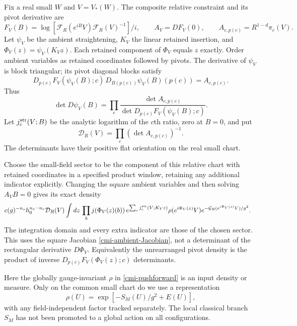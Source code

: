 Fix a real small $W$ and $V=V_*(W)$. The composite relative
constraint and its pivot derivative are
\begin{equation}\label{cmi-relative}
 F_V(B)=\log[\mathcal F_R(e^{iB}V)\mathcal F_R(V)^{-1}]/i,
 \qquad A_V=D F_V(0),\qquad
 A_{c,p(c)}=R^{1-d}\pi_c(V).
\end{equation}
Let $\psi_V$ be the ambient straightening, $K_V$ the linear
retained insertion, and $\Phi_V(z)=\psi_V(K_Vz)$.
Each retained component of $\Phi_V$ equals $z$ exactly.
Order ambient variables as retained coordinates followed by
pivots. The derivative of $\psi_V$ is block triangular;
its pivot diagonal blocks satisfy
\[
 D_{p(c)}F_V(\psi_V(B);c)\,
 D_{B(p(c))}\psi_V(B)(p(c))=A_{c,p(c)}.
\]
Thus
\begin{equation}\label{cmi-ambient-Jacobian}
 \det D\psi_V(B)=
   \prod_c\frac{\det A_{c,p(c)}}
                  {\det D_{p(c)}F_V(\psi_V(B);c)}.
\end{equation}
Let $j_c^{\rm str}(V;B)$ be the analytic logarithm of the
$c$th ratio, zero at $B=0$, and put
\begin{equation}\label{cmi-background-delta}
 \mathcal D_R(V)=\prod_c(\det A_{c,p(c)})^{-1}.
\end{equation}
The determinants have their positive flat orientation on the
real small chart.

Choose the small-field sector to be the component of this
relative chart with retained coordinates in a specified product
window, retaining any additional indicator explicitly. Changing
the square ambient variables and then solving $A_VB=0$ gives
its exact density
\begin{align}
 &c(g)^{-n_s}h_0^{n_e-n_c}\mathcal D_R(V)
 \int dz\,
    \prod_bj(\Phi_V(z)(b))\,
    e^{\sum_cj_c^{\rm str}(V;K_Vz)}
    \rho(e^{i\Phi_V(z)}V)
    e^{-\mathcal G_R(e^{i\Phi_V(z)}V)/g^2}.
                                                        \label{cmi-local-density}
\end{align}
The integration domain and every extra indicator are those
of the chosen sector. This uses the square Jacobian
\eqref{cmi-ambient-Jacobian}, not a determinant of the
rectangular derivative $D\Phi_V$. Equivalently the unrearranged
pivot density is the product of inverse
$D_{p(c)}F_V(\Phi_V(z);c)$ determinants.

Here the globally gauge-invariant $\rho$ in
\eqref{cmi-pushforward} is an input density or measure.
Only on the common small chart do we use a representation
\[
 \rho(U)=\exp[-S_M(U)/g^2+E(U)],
\]
with any field-independent factor tracked separately.
The local classical branch $S_M$ has not been promoted
to a global action on all configurations.

